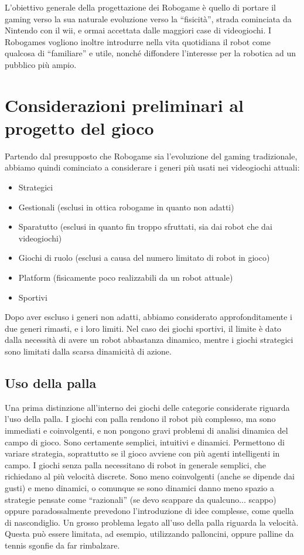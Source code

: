 L'obiettivo generale della progettazione dei Robogame è quello di portare il gaming verso la sua naturale evoluzione verso la ``fisicità'', strada cominciata da Nintendo con il wii, e ormai accettata dalle maggiori case di videogiochi. I Robogames vogliono inoltre introdurre nella vita quotidiana il robot come qualcosa di ``familiare'' e utile, nonché diffondere l'interesse per la robotica ad un pubblico più ampio.

\section{Considerazioni preliminari al progetto del gioco}
Partendo dal presupposto che Robogame sia l’evoluzione del gaming tradizionale, abbiamo quindi cominciato a considerare i generi più usati nei videogiochi attuali:
\begin{itemize}
\item Strategici
\item Gestionali (esclusi in ottica robogame in quanto non adatti)
\item Sparatutto (esclusi in quanto fin troppo sfruttati, sia dai robot che dai videogiochi)
\item Giochi di ruolo (esclusi a causa del numero limitato di robot in gioco)
\item Platform (fisicamente poco realizzabili da un robot attuale)
\item Sportivi
\end{itemize}
Dopo aver escluso i generi non adatti, abbiamo considerato approfonditamente i due generi rimasti, e i loro limiti. Nel caso dei giochi sportivi, il limite è dato dalla necessità di avere un robot abbastanza dinamico, mentre i giochi strategici sono limitati dalla scarsa dinamicità di azione.

\subsection*{Uso della palla} Una prima distinzione all'interno dei giochi delle categorie considerate riguarda l'uso della palla. 
I giochi con palla rendono il robot più complesso, ma sono immediati e coinvolgenti, e non pongono gravi problemi di analisi dinamica del campo di gioco. Sono certamente semplici, intuitivi e dinamici. Permettono di variare strategia, soprattutto se il gioco avviene con più agenti intelligenti in campo.
I giochi senza palla necessitano di robot in generale semplici, che richiedano al più velocità discrete. Sono meno coinvolgenti (anche se dipende dai gusti) e meno dinamici, o comunque se sono dinamici danno meno spazio a strategie pensate come ``razionali'' (se devo scappare da qualcuno... scappo) oppure paradossalmente prevedono l'introduzione di idee complesse, come quella di nascondiglio.
Un grosso problema legato all'uso della palla riguarda la velocità. Questa può essere limitata, ad esempio, utilizzando palloncini, oppure palline da tennis sgonfie da far rimbalzare.

